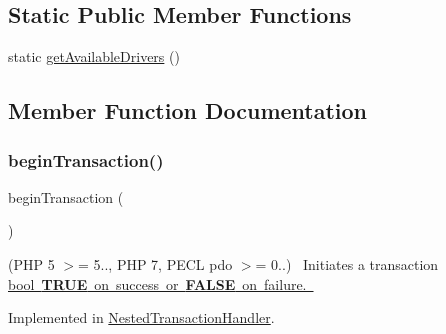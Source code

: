 \subsection*{Static Public Member Functions}
\begin{DoxyCompactItemize}
\item 
static \mbox{\hyperlink{interface_pes_1_1_database_1_1_handler_1_1_p_d_o_interface_ad9bdac1c5dfa2d96210795e7711b8b93}{get\+Available\+Drivers}} ()
\end{DoxyCompactItemize}


\subsection{Member Function Documentation}
\mbox{\label{interface_pes_1_1_database_1_1_handler_1_1_p_d_o_interface_af3380f3b13931d581fa973a382946b32}} 
\subsubsection{\texorpdfstring{begin\+Transaction()}{beginTransaction()}}
{\footnotesize\ttfamily begin\+Transaction (\begin{DoxyParamCaption}{ }\end{DoxyParamCaption})}

(P\+HP 5 $>$= 5.., P\+HP 7, P\+E\+CL pdo $>$= 0..)~\newline
 Initiates a transaction \mbox{\hyperlink{}{bool {\bfseries T\+R\+UE} on success or {\bfseries F\+A\+L\+SE} on failure. }}

Implemented in \mbox{\hyperlink{class_pes_1_1_database_1_1_handler_1_1_nested_transaction_handler_af3380f3b13931d581fa973a382946b32}{Nested\+Transaction\+Handler}}.

\mbox{\label{interface_pes_1_1_database_1_1_handler_1_1_p_d_o_interface_af5674c27d4a92f6228565010eacbb9cb}} 
